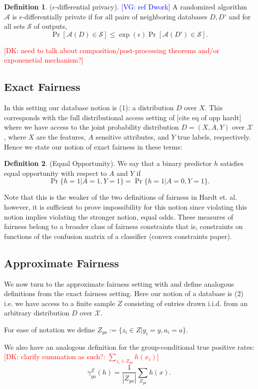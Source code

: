 \documentclass[format = sigconf]{acmart}
\newcommand{\dk}[1]{\textcolor{red}{[DK: #1]}}
\newcommand{\vg}[1]{\textcolor{blue}{[VG: #1]}}
\newcommand{\A}{\mathcal{A}}
\newcommand{\X}{\mathcal{X}}
\renewcommand{\S}{\mathcal{S}}
\newcommand{\1}{\mathbbm{1}}
\newcommand{\eps}{\epsilon}
\newcommand{\zya}{Z_{ya}}
\theoremstyle{definition}
\newtheorem{defn}{Definition}[section]
\begin{document}
\begin{defn}
($\eps$-differential privacy). \vg{ref Dwork} A randomized algorithm $\A$ is $\eps$-differentially private if for all pairs of neighboring databases $D,D'$ and for all sets $\S$ of outputs,
	$$\Pr[\A(D)\in \S] \leq \exp(\eps)\Pr[\A(D')\in \S].$$
\end{defn}
\dk{need to talk about composition/post-processing theorems and/or exponenetial mechanism?}
\subsection{Exact Fairness}

In this setting our database notion is (1): a distribution $D$ over $X$. This corresponds with the full distributional access setting of [cite eq of opp hardt] where we have access to the joint probability distribution $D = (X, A, Y)$ over $\X$, where $X$ are the features, $A$ sensitive attributes, and $Y$ true labels, respectively. Hence we state our notion of exact fairness in these terms:

\begin{defn}
	 (Equal Opportunity). We say that a binary predictor $h$ satisfies equal opportunity with respect to $A$ and $Y$ if
	$$\Pr\{h = 1 | A =1, Y=1\} = \Pr\{h = 1 | A=0, Y=1\}.$$
\end{defn}

Note that this is the weaker of the two definitions of fairness in Hardt et. al. however, it is sufficient to prove impossibility for this notion since violating this notion implies violating the stronger notion, equal odds. These measures of fairness belong to a broader class of fairness constraints that is, constraints on functions of the confusion matrix of a classifier (convex constraints paper).

\subsection{Approximate Fairness}
We now turn to the approximate fairness setting with and define analogous definitions from the exact fairness setting. Here our notion of a database is (2) i.e. we have access to a finite sample $Z$ consisting of entries drawn i.i.d. from an arbitrary distribution $D$ over $\X$.

For ease of notation we define $\zya := \{z_i \in Z | y_i = y, a_i = a \}$.

We also have an analogous definition for the group-conditional true positive rates: \dk {clarify summation as such?: $\sum_{z_i \in \zya} h(x_i)$}
$$\gamma_{ya}^Z(h) = \frac{1}{|\zya|} \sum_{\zya} h(x).$$
\end{document}

